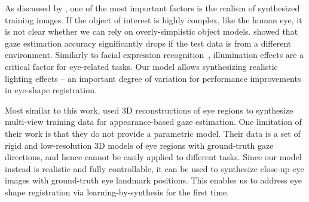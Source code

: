 As discussed by \citet{kaneva2011evaluation}, one of the most important factors is the realism of synthesized training images.
If the object of interest is highly complex, like the human eye, it is not clear whether we can rely on overly-simplistic object models.
\citet{zhang15_cvpr} showed that gaze estimation accuracy significantly drops if the test data is from a different environment.
Similarly to facial expression recognition~\cite{stratou2011effect}, illumination effects are a critical factor for eye-related tasks.
Our model allows synthesizing realistic lighting effects -- an important degree of variation for performance improvements in eye-shape registration.

Most similar to this work, \citet{sugano2014learning} used 3D reconstructions of eye regions to synthesize multi-view training data for appearance-based gaze estimation.
One limitation of their work is that they do not provide a parametric model.
Their data is a set of rigid and low-resolution 3D models of eye regions with ground-truth gaze directions, and hence cannot be easily applied to different tasks.
Since our model instead is realistic and fully controllable, it can be used to synthesize close-up eye images with ground-truth eye landmark positions.
This enables us to address eye shape registration via learning-by-synthesis for the first time.



